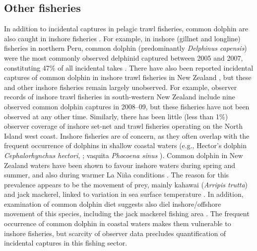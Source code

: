 \documentclass[10pt]{article}
\begin{document}
\subsection*{Other fisheries}
In addition to incidental captures in pelagic trawl fisheries, common dolphin are also caught in inshore fisheries \cite{abraham_summary_98-08, mangel_artisanal_2010}.  For example, in inshore (gillnet and longline) fisheries in northern Peru, common dolphin (predominantly \emph{Delphinus capensis}) were the most commonly observed delphinid captured between 2005 and 2007, constituting 47\% of all incidental takes \cite{mangel_artisanal_2010}.  There have also been reported incidental captures of common dolphin in inshore trawl fisheries in New Zealand \cite{abraham_summary_98-08}, but these and other inshore fisheries remain largely unobserved.  For example, observer records of inshore trawl fisheries in south-western New Zealand include nine observed common dolphin captures in \mbox{2008--09}, but these fisheries have not been observed at any other time. Similarly, there has been little (less than 1\%) observer coverage of inshore set-net and trawl fisheries operating on the North Island west coast. Inshore fisheries are of concern, as they often overlap with the frequent occurrence of dolphins in shallow coastal waters (e.g., Hector's dolphin \emph{Cephalorhynchus hectori}, \cite{rayment_observations_2009}; vaquita \emph{Phocoena sinus} \cite{dagrosa_bycatch_2000}). Common dolphin in New Zealand waters have been shown to favour inshore waters during spring and summer, and also during warmer La Ni{\~n}a conditions \cite{neumann_seasonal_2001}. The reason for this prevalence appears to be the movement of prey, mainly kahawai (\emph{Arripis trutta}) and jack mackerel, linked to variation in sea surface temperature \cite{neumann_seasonal_2001}.  In addition, examination of common dolphin diet suggests also diel inshore/offshore movement of this species, including the jack mackerel fishing area \cite{meynier_stomach_2008}.  The frequent occurrence of common dolphin in coastal waters makes them vulnerable to inshore fisheries, but scarcity of observer data precludes quantification of incidental captures in this fishing sector.  
\end{document}

